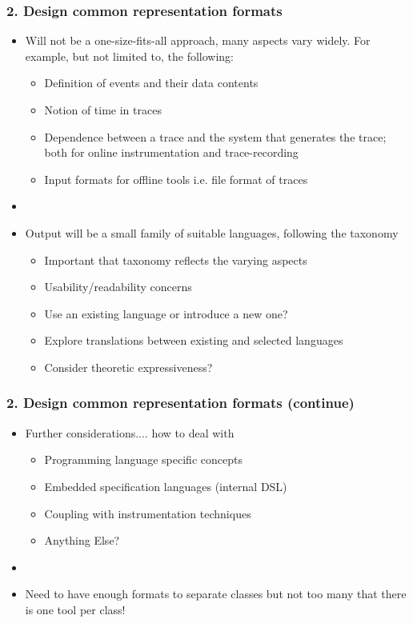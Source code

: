 \documentclass{beamer}
\newcommand{\addhere}{{\color{red} Anything Else?}}
\begin{document}
\begin{frame}
\frametitle{2. Design common representation formats}
\begin{itemize}
	\item Will not be a one-size-fits-all approach, many aspects vary widely. For example, but not limited to, the following:
	\begin{itemize}
		\item Definition of events and their data contents
		\item Notion of time in traces
		\item Dependence between a trace and the system that generates the trace; both for online instrumentation and trace-recording
		\item Input formats for offline tools i.e. file format of traces
	\end{itemize}
	\item[]
	\item Output will be a small family of suitable languages, following the taxonomy 
	\begin{itemize}
		\item Important that taxonomy reflects the varying aspects
		\item Usability/readability concerns
		\item Use an existing language or introduce a new one?
		\item Explore translations between existing and selected languages
		\item Consider theoretic expressiveness?
	\end{itemize}
\end{itemize}
\end{frame}	

\begin{frame}
\frametitle{2. Design common representation formats (continue)}
\begin{itemize}
	\item Further considerations.... how to deal with
	\begin{itemize}
		\item Programming language specific concepts
		\item Embedded specification languages (internal DSL)
		\item Coupling with instrumentation techniques
		\item \addhere{}
	\end{itemize}
	\item[]
	\item Need to have enough formats to separate classes but not too many that there is one tool per class!
\end{itemize}
\end{frame}
\end{document}
